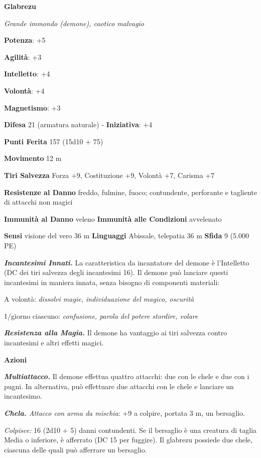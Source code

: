 \begin{multicols}{2}
\textbf{Glabrezu}

\emph{Grande immondo (demone), caotico malvagio}

\textbf{Potenza}: +5

\textbf{Agilità}: +3

\textbf{Intelletto}: +4

\textbf{Volontà}: +4

\textbf{Magnetismo}: +3

\textbf{Difesa} 21 (armatura naturale) - \textbf{Iniziativa}: +4

\textbf{Punti Ferita} 157 (15d10 + 75)

\textbf{Movimento} 12 m

\textbf{Tiri Salvezza} Forza +9, Costituzione +9, Volontà +7, Carisma
+7

\textbf{Resistenze al Danno} freddo, fulmine, fuoco; contundente,
perforante e tagliente di attacchi non magici

\textbf{Immunità al Danno} veleno \textbf{Immunità alle Condizioni}
avvelenato

\textbf{Sensi} visione del vero 36 m
\textbf{Linguaggi} Abissale, telepatia 36 m \textbf{Sfida} 9 (5.000 PE)

\emph{\textbf{Incantesimi Innati.}} La caratteristica da incantatore del
demone è l'Intelletto (DC dei tiri salvezza degli incantesimi 16). Il
demone può lanciare questi incantesimi in maniera innata, senza bisogno
di componenti materiali:

A volontà: \emph{dissolvi magie, individuazione del magico, oscurità}

1/giorno ciascuno: \emph{confusione, parola del potere stordire, volare}

\emph{\textbf{Resistenza alla Magia.}} Il demone ha vantaggio ai tiri
salvezza contro incantesimi e altri effetti magici.

\textbf{Azioni}

\emph{\textbf{Multiattacco.}} Il demone effettua quattro attacchi: due
con le chele e due con i pugni. In alternativa, può effettuare due
attacchi con le chele e lanciare un incantesimo.

\emph{\textbf{Chela.} Attacco con arma da mischia}: +9 a colpire,
portata 3 m, un bersaglio.

\emph{Colpisce:} 16 (2d10 + 5) danni contundenti. Se il bersaglio è una
creatura di taglia Media o inferiore, è afferrato (DC 15 per fuggire).
Il glabrezu possiede due chele, ciascuna delle quali può afferrare un
bersaglio.


\end{multicols}
